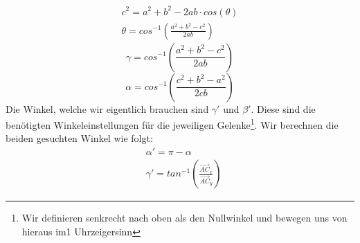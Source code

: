 \begin{equation}
	\begin{split}
		c^2=a^2+b^2-2ab \cdot cos(\theta)\\
		\theta=cos^{-1}\left(\frac{a^2+b^2-c^2}{2ab}\right)
	\end{split}
\end{equation}
\begin{equation*}
	\gamma=cos^{-1}\left(\frac{a^2+b^2-c^2}{2ab}\right)
\end{equation*}
\begin{equation*}
	\alpha=cos^{-1}\left(\frac{c^2+b^2-a^2}{2cb}\right)
\end{equation*}
Die Winkel, welche wir eigentlich brauchen sind $\gamma'$ und $\beta'$. Diese sind die benötigten Winkeleinstellungen für die jeweiligen Gelenke\footnote{Wir definieren senkrecht nach oben als den Nullwinkel und bewegen uns von hieraus im1 Uhrzeigersinn}. Wir berechnen die beiden gesuchten Winkel wie folgt:
\begin{align*}
		&\alpha' = \pi - \alpha \\
		&\gamma' = tan^{-1}\left(\frac{\vec{AC}_x}{\vec{AC}_y}\right)
\end{align*}
%
